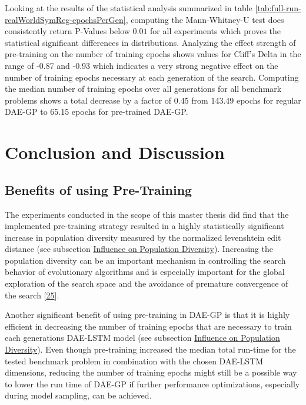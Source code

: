 \documentclass[
  11pt,
]{article}
\begin{document}
Looking at the results of the statistical analysis summarized in table \ref{tab:full-run-realWorldSymReg-epochsPerGen}, computing the Mann-Whitney-U test does consistently return P-Values below \(0.01\) for all experiments which proves the statistical significant differences in distributions.
Analyzing the effect strength of pre-training on the number of training epochs shows values for Cliff's Delta in the range of -0.87 and -0.93 which indicates a very strong negative effect on the number of training epochs necessary at each generation of the search.
Computing the median number of training epochs over all generations for all benchmark problems shows a total decrease by a factor of 0.45 from 143.49 epochs for regular DAE-GP to 65.15 epochs for pre-trained DAE-GP.

\hypertarget{conclusion-and-discussion}{%
\section{Conclusion and Discussion}\label{conclusion-and-discussion}}

\hypertarget{benefits-of-using-pre-training}{%
\subsection{Benefits of using Pre-Training}\label{benefits-of-using-pre-training}}

The experiments conducted in the scope of this master thesis did find that the implemented pre-training strategy resulted in a highly statistically significant increase in population diversity measured by the normalized levenshtein edit distance (see subsection \protect\hyperlink{influence-on-population-diversity}{Influence on Population Diversity}).
Increasing the population diversity can be an important mechanism in controlling the search behavior of evolutionary algorithms and is especially important for the global exploration of the search space and the avoidance of premature convergence of the search {[}\protect\hyperlink{ref-Sudholt2020}{25}{]}.

Another significant benefit of using pre-training in DAE-GP is that it is highly efficient in decreasing the number of training epochs that are necessary to train each generations DAE-LSTM model (see subsection \protect\hyperlink{influence-on-population-diversity}{Influence on Population Diversity}).
Even though pre-training increased the median total run-time for the tested benchmark problem in combination with the chosen DAE-LSTM dimensions, reducing the number of training epochs might still be a possible way to lower the run time of DAE-GP if further performance optimizations, especially during model sampling, can be achieved.
\end{document}
